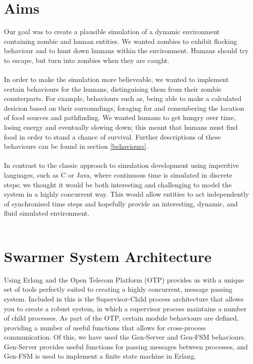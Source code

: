 \documentclass[10pt, a4paper, conference, compsocconf]{IEEEtran}
\begin{document}
\section{Aims \label{aims}}
Our goal was to create a plausible simulation of a dynamic environment containing zombie and human entities. We wanted zombies to exhibit flocking behaviour and to hunt down humans within the environment. Humans should try to escape, but turn into zombies when they are caught.\\
\\
In order to make the simulation more believeable, we wanted to implement certain behaviours for the humans, distinguising them from their zombie counterparts. For example, behaviours such as, being able to make a calculated desicion based on their surroundings, foraging for and remembering the location of food sources and pathfinding. We wanted humans to get hungry over time, losing energy and eventually slowing down; this meant that humans must find food in order to stand a chance of survival. Further descriptions of these behaviours can be found in section \ref{behaviours}.\\
\\
In contrast to the classic approach to simulation development using imperitive languages, such as C or Java, where continuous time is simulated in discrete steps; we thought it would be both interesting and challenging to model the system in a highly concurrent way. This would allow entities to act independently of synchronised time steps and hopefully provide an interesting, dynamic, and fluid simulated environment.\\
\\

\section{Swarmer System Architecture \label{architecture}}

Using Erlang and the Open Telecom Platform\cite{otp} (OTP) provides us with a unique set of tools perfectly suited to creating a highly concurrent, message passing system. Included in this is the Supervisor-Child process architecture that allows you to create a robust system, in which a supervisor process maintains a number of child processes. As part of the OTP, certain module behaviours are defined, providing a number of useful functions that allows for cross-process communication. Of this, we have used the Gen-Server\cite{gen_server} and Gen-FSM\cite{gen_fsm} behaviours. Gen-Server provides useful functions for passing messages between processes, and Gen-FSM is used to implement a finite state machine in Erlang.
\end{document}
